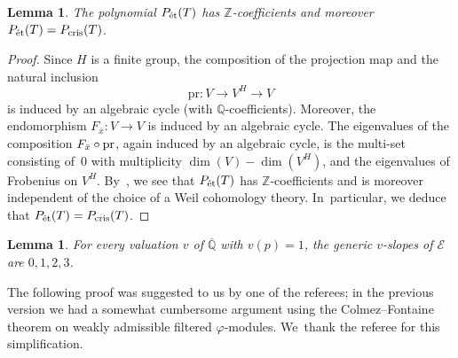 \documentclass[JEP,XML,SOM,Unicode,published]{cedram}
\numberwithin{equation}{subsection}
\newtheorem{lem}[thm]{Lemma}
\theoremstyle{definition}
\newcommand{\Z}{\mathbb Z}
\newcommand{\Q}{\mathbb Q}
\let\mc\mathcal
\let\mb\mathbb
\begin{document}
\begin{lem}\label{lem: etale-slopes-and-crystalline-slopes}
The polynomial $P_{\textnormal{ét}}(T)$ has $\Z$-coefficients and moreover $P_{\textnormal{ét}}(T)=P_{\textnormal{cris}}(T)$.
\end{lem}

\begin{proof}
Since $H$ is a finite group, the composition of the projection map and the natural inclusion
\[
\mathrm{pr}\colon V\to V^H\to V
\]
is induced by an algebraic cycle (with $\Q$-coefficients). Moreover, the endomorphism $F_{\bar x}\colon V\to V$ is induced by an algebraic cycle. The eigenvalues of the composition $F_{\bar x}\circ\nobreak\mathrm{pr}$, again induced by an algebraic cycle, is the multi-set consisting of~$0$ with multiplicity $\dim(V)-\dim(V^H)$, and the eigenvalues of Frobenius on $V^H$. By~\hbox{\cite[Th.\,2(2)]{Katz-Messing-Some-Consequences-of-the-Riemann-Hypothesis-for-Varieties-over-Finite-Fields}}, we see that $P_\textnormal{ét}(T)$ has $\mb{Z}$-coefficients and is moreover independent of the choice of a Weil cohomology theory. In~particular, we deduce that $P_{\textnormal{ét}}(T)=P_{\textnormal{cris}}(T)$.
\end{proof}

\begin{lem}\label{lemma: mirror-quintic-ord}
For every valuation $v$ of $\overline{\Q}$ with $v(p)=1$, the generic $v$-slopes of $\mc{E}$ are $0,1,2,3$.
\end{lem}

The following proof was suggested to us by one of the referees; in the previous version we had a somewhat cumbersome argument using the Colmez--Fontaine theorem on weakly admissible filtered $\varphi$-modules. We~thank the referee for this simplification.
\end{document}
